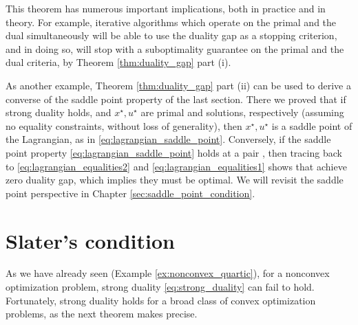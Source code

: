 This theorem has numerous important implications, both in practice and in 
theory. For example, iterative algorithms which operate on the primal and the
dual simultaneously will be able to use the duality gap as a stopping criterion, 
and in doing so, will stop with a suboptimality guarantee on the primal and the 
dual criteria, by Theorem \ref{thm:duality_gap} part (i).  

As another example, Theorem \ref{thm:duality_gap} part (ii) can be used to
derive a converse of the saddle point property of the last section. There we
proved that if strong duality holds, and $x^\star,u^\star$ are primal and 
solutions, respectively (assuming no equality constraints, without loss of
generality), then $x^\star, u^\star$ is a saddle point of the Lagrangian, as in
\eqref{eq:lagrangian_saddle_point}. Conversely, if the saddle point property 
\eqref{eq:lagrangian_saddle_point} holds at a pair ,
then tracing back to \eqref{eq:lagrangian_equalities2} and
\eqref{eq:lagrangian_equalities1} shows that  achieve
zero duality gap, which implies they must be optimal. We will revisit the saddle
point perspective in Chapter \ref{sec:saddle_point_condition}.   
 
\section{Slater's condition}
\label{sec:slater_condition}

As we have already seen (Example \ref{ex:nonconvex_quartic}), for a nonconvex 
optimization problem, strong duality \eqref{eq:strong_duality} can fail to
hold. Fortunately, strong duality holds for a broad class of convex optimization
problems, as the next theorem makes precise.  

